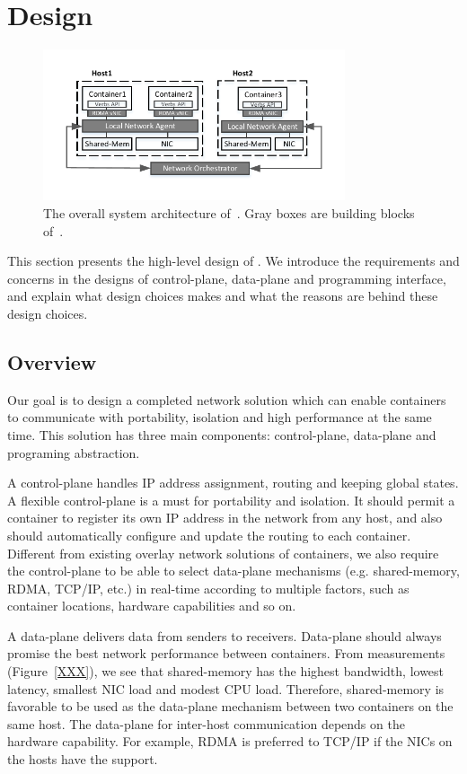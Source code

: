 \section{Design} \label{sec:design}

\begin{figure}[t!] 
     \centering 
     \includegraphics[width=3.5in]{figures/system-arch.pdf} 
    \caption{\label{fig:sysarch} The overall system architecture of~\sysname. Gray boxes are building blocks of~\sysname.} 
\end{figure} 

This section presents the high-level design of \sysname. We introduce
the requirements and concerns in the designs of control-plane, data-plane
and programming interface, and explain what design choices \sysname makes 
and what the reasons are behind these design choices.

\subsection{Overview}

Our goal is to design a completed network solution which can enable containers
to communicate with portability, isolation and high performance at the same time.
This solution has three main components: control-plane, data-plane and programing
abstraction. 

A control-plane handles IP address assignment, routing and keeping global states.
A flexible control-plane is a must for portability and isolation. 
It should permit a container to register its own IP address in the network
from any host, and also should automatically configure and update the routing 
to each container. Different from existing overlay network solutions of 
containers, we also require the control-plane to be able to select 
data-plane mechanisms (e.g. shared-memory, RDMA, TCP/IP, etc.) 
in real-time according to multiple factors, 
such as container locations, hardware capabilities and so on.

A data-plane delivers data from senders to receivers.
Data-plane should always promise the best network performance between 
containers. From measurements (Figure~\ref{XXX}), 
we see that shared-memory has the highest
bandwidth, lowest latency, smallest NIC load and modest CPU load. 
Therefore, shared-memory is favorable to be used as the data-plane 
mechanism between two containers on the same host. 
The data-plane for inter-host communication
depends on the hardware capability. For example, RDMA is preferred to TCP/IP 
if the NICs on the hosts have the support.

